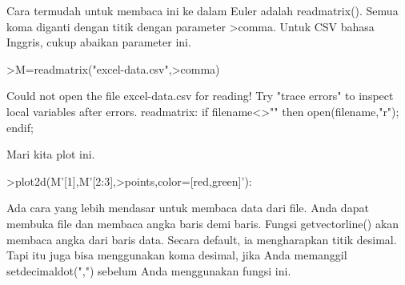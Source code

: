 \documentclass{article}
\begin{document}
\begin{eulernotebook}
\begin{eulercomment}
\begin{eulercomment}
\begin{eulercomment}
Cara termudah untuk membaca ini ke dalam Euler adalah readmatrix().
Semua koma diganti dengan titik dengan parameter \textgreater{}comma. Untuk CSV
bahasa Inggris, cukup abaikan parameter ini.
\end{eulercomment}
\begin{eulerprompt}
>M=readmatrix("excel-data.csv",>comma)
\end{eulerprompt}
\begin{euleroutput}
  Could not open the file
  excel-data.csv
  for reading!
  Try "trace errors" to inspect local variables after errors.
  readmatrix:
      if filename<>"" then open(filename,"r"); endif;
\end{euleroutput}
\begin{eulercomment}
Mari kita plot ini.
\end{eulercomment}
\begin{eulerprompt}
>plot2d(M'[1],M'[2:3],>points,color=[red,green]'):
\end{eulerprompt}
\begin{eulercomment}
Ada cara yang lebih mendasar untuk membaca data dari file. Anda dapat
membuka file dan membaca angka baris demi baris. Fungsi
getvectorline() akan membaca angka dari baris data. Secara default, ia
mengharapkan titik desimal. Tapi itu juga bisa menggunakan koma
desimal, jika Anda memanggil setdecimaldot(",") sebelum Anda
menggunakan fungsi ini.


\end{eulercomment}
\end{eulercomment}
\end{eulercomment}
\end{eulernotebook}
\end{document}
